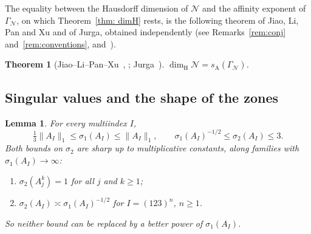 \documentclass[11pt]{amsart}
\newtheorem{lettertheorem}{Theorem}%
\newtheorem{lemma}[proposition]{Lemma}
\theoremstyle{definition}
\theoremstyle{remark}
\newcommand{\cN}{\mathcal N}
\newcommand{\GN}{\Gamma_{\mathcal N}}
\newcommand{\sA}{s_{\mathrm A}}
\newcommand{\dimH}{\dim_{\mathrm H}}
\newcommand{\norm}[1]{\lVert #1\rVert}
\begin{document}
The equality between the Hausdorff dimension of $\cN$ and the affinity exponent of $\GN$, on which Theorem~\ref{thm: dimH} rests, is the following theorem of Jiao, Li, Pan and Xu and of Jurga, obtained independently (see Remarks~\ref{rem:conj} and~\ref{rem:conventions}, and~\cite[Remark~1.6]{LPX23}).

\begin{lettertheorem}[Jiao--Li--Pan--Xu~{\cite[\S5]{JLPX23}, \cite[Thm.~1.4]{LPX23}}; Jurga~{\cite[Thm.~1.1]{Jur26}}]\label{thm:jurga}
$\dimH\cN=\sA(\GN)$.
\end{lettertheorem}

\subsection*{Singular values and the shape of the zones}

\begin{lemma}\label{lem:sv}
For every multiindex $I$,
\[
  \tfrac13\norm{A_I}_1\le\sigma_1(A_I)\le\norm{A_I}_1,\qquad
  \sigma_1(A_I)^{-1/2}\le\sigma_2(A_I)\le3 .
\]
Both bounds on $\sigma_2$ are sharp up to multiplicative constants, along families
with $\sigma_1(A_I)\to\infty$:
\begin{enumerate}
\item[(a)] $\sigma_2(A_j^k)=1$ for all $j$ and $k\ge1$;
\item[(b)] $\sigma_2(A_I)\asymp\sigma_1(A_I)^{-1/2}$ for $I=(123)^n$, $n\ge1$.
\end{enumerate}
So neither bound can be replaced by a better power of $\sigma_1(A_I)$.
\end{lemma}
\end{document}
